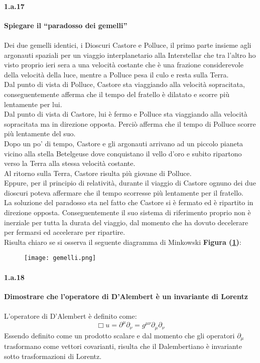 \documentclass[twoside]{article}
\begin{document}
\paragraph{1.a.17} \textbf{Spiegare il “paradosso dei gemelli”}\\ \\
Dei due gemelli identici, i Dioscuri Castore e Polluce, il primo parte insieme agli argonauti spaziali per un viaggio interplanetario alla Interstellar che tra l'altro ho visto proprio ieri sera a una velocità costante che è una frazione considerevole della velocità della luce, mentre a Polluce pesa il culo e resta sulla Terra.
\\
Dal punto di vista di Polluce, Castore sta viaggiando alla velocità sopracitata, conseguentemente afferma che il tempo del fratello è dilatato e scorre più lentamente per lui.
\\
Dal punto di vista di Castore, lui è fermo e Polluce sta viaggiando alla velocità sopracitata ma in direzione opposta. Perciò afferma che il tempo di Polluce scorre più lentamente del suo.
\\
Dopo un po' di tempo, Castore e gli argonauti arrivano ad un piccolo pianeta vicino alla stella Betelgeuse dove conquistano il vello d'oro e subito ripartono verso la Terra alla stessa velocità costante.
\\
Al ritorno sulla Terra, Castore risulta più giovane di Polluce.
\\
Eppure, per il principio di relatività, durante il viaggio di Castore ognuno dei due dioscuri poteva affermare che il tempo scorresse più lentamente per il fratello.
\\
La soluzione del paradosso sta nel fatto che Castore si è fermato ed è ripartito in direzione opposta. Conseguentemente il suo sistema di riferimento proprio non è inerziale per tutta la durata del viaggio, dal momento che ha dovuto decelerare per fermarsi ed accelerare per ripartire.
\\
Risulta chiaro se si osserva il seguente diagramma di Minkowski \textbf{Figura (\ref{gemelli})}:
\begin{figure}[H]
    \centering
    \texttt{[image: gemelli.png]}
    \label{gemelli}
\end{figure}

\paragraph{1.a.18} \textbf{Dimostrare che l’operatore di D’Alembert è un invariante di Lorentz}\\ \\
L'operatore di D'Alembert è definito come:
\begin{equation*}
    \Box u=\partial ^{\mu} \partial _{\nu}=g^{\mu \nu} \partial _{\mu }\partial_{\nu}
\end{equation*}
Essendo definito come un prodotto scalare e dal momento che gli operatori $\partial_{\mu}$ trasformano come vettori covarianti, risulta che il Dalembertiano è invariante sotto trasformazioni di Lorentz.
\end{document}
